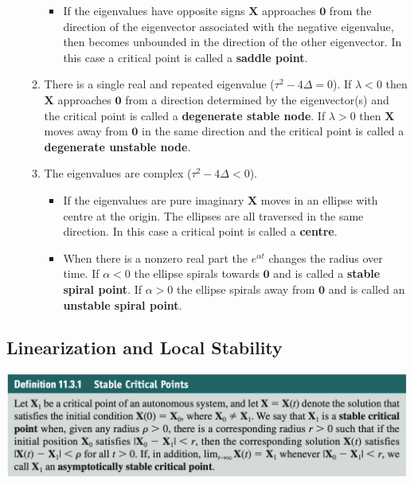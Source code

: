 \documentclass{article}
\begin{document}
\begin{itemize}
\begin{enumerate}
\begin{itemize}
                  \item If the eigenvalues have opposite signs $\mathbf{X}$ approaches $\mathbf{0}$ from the direction of the eigenvector associated with the negative eigenvalue, then becomes unbounded in the direction of the other eigenvector. In this case a critical point is called a \textbf{saddle point}.
                \end{itemize}

          \item There is a single real and repeated eigenvalue ($\tau^2 - 4 \Delta = 0$). If $\lambda < 0$ then $\mathbf{X}$ approaches $\mathbf{0}$ from a direction determined by the eigenvector(s) and the critical point is called a \textbf{degenerate stable node}. If $\lambda > 0$ then $\mathbf{X}$ moves away from $\mathbf{0}$ in the same direction and the critical point is called a \textbf{degenerate unstable node}.

          \item The eigenvalues are complex ($\tau^2 - 4 \Delta < 0$).

                \begin{itemize}
                  \item If the eigenvalues are pure imaginary $\mathbf{X}$ moves in an ellipse with centre at the origin. The ellipses are all traversed in the same direction. In this case a critical point is called a \textbf{centre}.

                  \item When there is a nonzero real part the $e^{\alpha t}$ changes the radius over time. If $\alpha < 0$ the ellipse spirals towards $\mathbf{0}$ and is called a \textbf{stable spiral point}. If $\alpha > 0$ the ellipse spirals away from $\mathbf{0}$ and is called an \textbf{unstable spiral point}.
                \end{itemize}
        \end{enumerate}
\end{itemize}

\subsection{Linearization and Local Stability}

\includegraphics[scale=0.47]{stable-critical-points}
\end{document}
